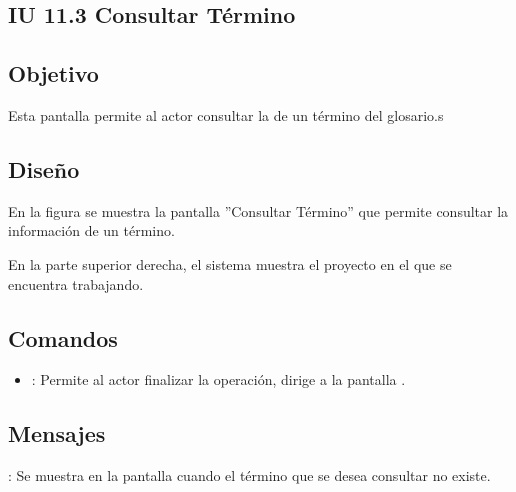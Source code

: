 \subsection{IU 11.3 Consultar Término}

\subsection{Objetivo}
	Esta pantalla permite al actor consultar la de un término del glosario.s
\subsection{Diseño}
	En la figura  se muestra la pantalla ''Consultar Término'' que permite consultar la información de un término.
	
	En la parte superior derecha, el sistema muestra el proyecto en el que se encuentra trabajando.

\subsection{Comandos}
\begin{itemize}
	\item {}: Permite al actor finalizar la operación, dirige a la pantalla .
\end{itemize}

\subsection{Mensajes}

\begin{Citemize}
	\item {}: Se muestra en la pantalla  cuando el término que se desea consultar no existe.
\end{Citemize}

